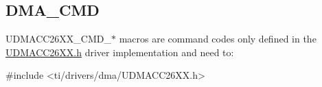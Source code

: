 \subsection{D\+M\+A\+\_\+\+C\+M\+D}
\label{group___d_m_a___c_m_d}
U\+D\+M\+A\+C\+C26\+X\+X\+\_\+\+C\+M\+D\+\_\+$\ast$ macros are command codes only defined in the \hyperlink{_u_d_m_a_c_c26_x_x_8h}{U\+D\+M\+A\+C\+C26\+X\+X.\+h} driver implementation and need to\+: 
\begin{DoxyCode}
\textcolor{preprocessor}{#include <ti/drivers/dma/UDMACC26XX.h>}
\end{DoxyCode}
 